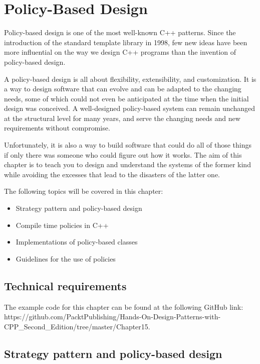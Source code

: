 ﻿\chapter{Policy-Based Design}

Policy-based design is one of the most well-known C++ patterns. Since the introduction of the standard template library in 1998, few new ideas have been more influential on the way we design C++ programs than the invention of policy-based design.

A policy-based design is all about flexibility, extensibility, and customization. It is a way to design software that can evolve and can be adapted to the changing needs, some of which could not even be anticipated at the time when the initial design was conceived. A well-designed policy-based system can remain unchanged at the structural level for many years, and serve the changing needs and new requirements without compromise.

Unfortunately, it is also a way to build software that could do all of those things if only there was someone who could figure out how it works. The aim of this chapter is to teach you to design and understand the systems of the former kind while avoiding the excesses that lead to the disasters of the latter one.

The following topics will be covered in this chapter:

\begin{itemize}
\item
  Strategy pattern and policy-based design
\item
  Compile time policies in C++
\item
  Implementations of policy-based classes
\item
  Guidelines for the use of policies
\end{itemize}

\section{Technical requirements}

The example code for this chapter can be found at the following GitHub link: https://github.com/PacktPublishing/Hands-On-Design-Patterns-with-CPP\_Second\_Edition/tree/master/Chapter15.

\section{Strategy pattern and policy-based design}

